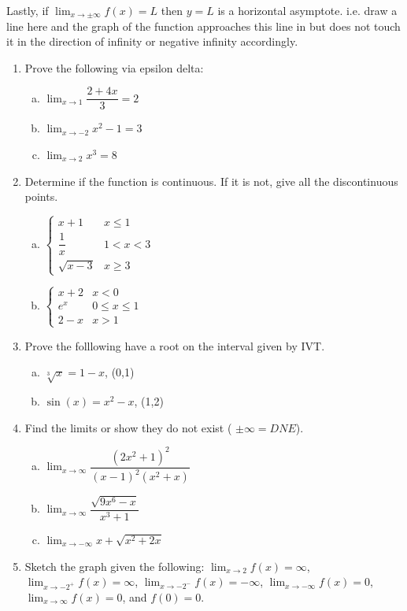 \documentclass[10pt]{article}
\newcommand{\ds}{\displaystyle}
\theoremstyle{Theorem}
\theoremstyle{definition}
\theoremstyle{remark}
\theoremstyle{custom}
\begin{document}
Lastly, if $\ds\lim_{x\rightarrow\pm\infty} f(x)=L$ then $y=L$ is a horizontal asymptote. i.e. draw a line here and the graph of the function approaches this line in but does not touch it in the direction of infinity or negative infinity accordingly. 
\newpage
\begin{enumerate}[1.]
\item Prove the following via epsilon delta:
\begin{enumerate}[a.]
\item $\ds\lim_{x\rightarrow1}\dfrac{2+4x}{3}=2$
\item $\ds\lim_{x\rightarrow-2}x^2-1=3$
\item $\ds\lim_{x\rightarrow2}x^3=8$
\end{enumerate}
\item Determine if the function is continuous. If it is not, give all the discontinuous points.
\begin{enumerate}[a.]
\item $\begin{cases} 
      x+1 & x\leq 1 \\
      \dfrac{1}{x} & 1< x< 3 \\
      \sqrt{x-3} & x\geq 3 
   \end{cases}$
   \item $\begin{cases} 
      x+2 & x< 0 \\
     e^x & 0\leq x\leq 1 \\
      2-x & x>1 
   \end{cases}$
\end{enumerate}
\item Prove the folllowing have a root on the interval given by IVT.
\begin{enumerate}[a.]
\item $\sqrt[3]{x}=1-x$, (0,1)
\item $\sin(x)=x^2-x$, (1,2)
\end{enumerate}
\item Find the limits or show they do not exist ( $\pm \infty=DNE$).
\begin{enumerate}[a.]
\item $\ds\lim_{x\rightarrow\infty}\dfrac{(2x^2+1)^2}{(x-1)^2(x^2+x)}$
\item $\ds\lim_{x\rightarrow\infty} \dfrac{\sqrt{9x^6-x}}{x^3+1}$
\item $\ds\lim_{x\rightarrow -\infty} x+\sqrt{x^2+2x}$
\end{enumerate}
\item Sketch the graph given the following: $\ds\lim_{x\rightarrow 2}f(x)=\infty$, $\ds\lim_{x\rightarrow-2^+}f(x)=\infty$, $\ds\lim_{x\rightarrow-2^-}f(x)=-\infty$, $\ds\lim_{x\rightarrow-\infty}f(x)=0$, $\ds\lim_{x\rightarrow\infty}f(x)=0$, and $f(0)=0$.
\end{enumerate}
\end{document}
